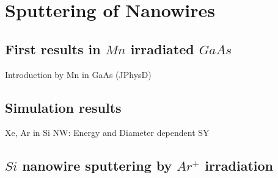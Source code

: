 \chapter{Sputtering of Nanowires}


\section{First results in $Mn$ irradiated $GaAs$}

Introduction by Mn in GaAs (JPhysD)


\section{Simulation results}
\label{sec:simsputering}
Xe, Ar in Si NW: Energy and Diameter dependent SY

\section{$Si$ nanowire sputtering by $Ar^+$ irradiation}
